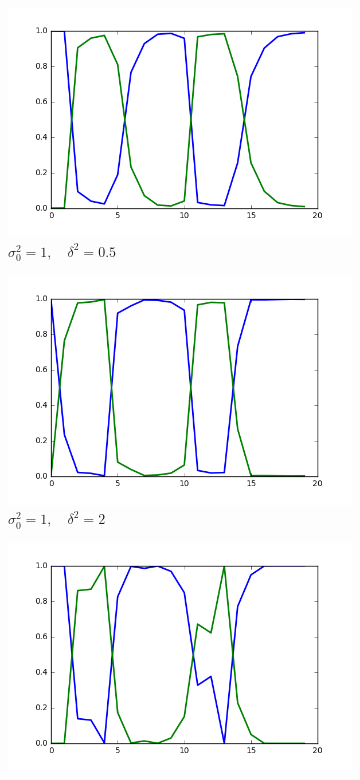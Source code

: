 \documentclass[12pt]{article}
\begin{document}
\begin{figure}[H]
        \begin{subfigure}[b]{0.33\textwidth}
                \includegraphics[width=\linewidth]{init-1_prop-05}
                \caption{$\sigma^2_0=1,\quad \delta^2=0.5$}
                \label{fig:gull}
        \end{subfigure}%
        \begin{subfigure}[b]{0.33\textwidth}
                \includegraphics[width=\linewidth]{init-1_prop-2}
                \caption{$\sigma^2_0=1,\quad \delta^2=2$}
                \label{fig:gull2}
        \end{subfigure}%
        \begin{subfigure}[b]{0.33\textwidth}
                \includegraphics[width=\linewidth]{init-1_prop-5}

\end{subfigure}
\end{figure}
\end{document}
